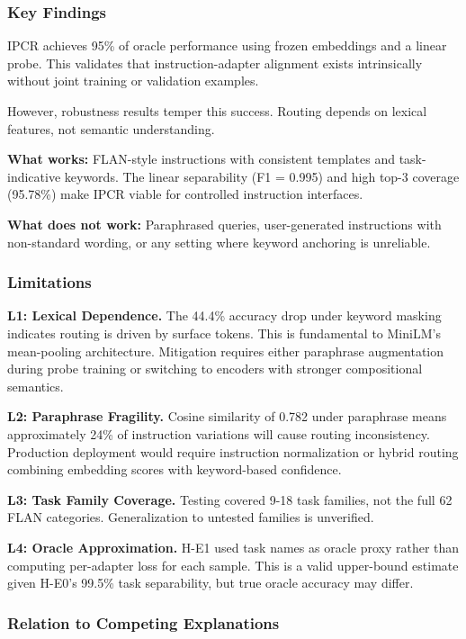 
\subsubsection{Key Findings}

IPCR achieves 95\% of oracle performance using frozen embeddings and a linear probe. This validates that instruction-adapter alignment exists intrinsically without joint training or validation examples.

However, robustness results temper this success. Routing depends on lexical features, not semantic understanding.

\textbf{What works:} FLAN-style instructions with consistent templates and task-indicative keywords. The linear separability (F1 = 0.995) and high top-3 coverage (95.78\%) make IPCR viable for controlled instruction interfaces.

\textbf{What does not work:} Paraphrased queries, user-generated instructions with non-standard wording, or any setting where keyword anchoring is unreliable.

\subsubsection{Limitations}

\textbf{L1: Lexical Dependence.} The 44.4\% accuracy drop under keyword masking indicates routing is driven by surface tokens. This is fundamental to MiniLM's mean-pooling architecture. Mitigation requires either paraphrase augmentation during probe training or switching to encoders with stronger compositional semantics.

\textbf{L2: Paraphrase Fragility.} Cosine similarity of 0.782 under paraphrase means approximately 24\% of instruction variations will cause routing inconsistency. Production deployment would require instruction normalization or hybrid routing combining embedding scores with keyword-based confidence.

\textbf{L3: Task Family Coverage.} Testing covered 9-18 task families, not the full 62 FLAN categories. Generalization to untested families is unverified.

\textbf{L4: Oracle Approximation.} H-E1 used task names as oracle proxy rather than computing per-adapter loss for each sample. This is a valid upper-bound estimate given H-E0's 99.5\% task separability, but true oracle accuracy may differ.

\subsubsection{Relation to Competing Explanations}

